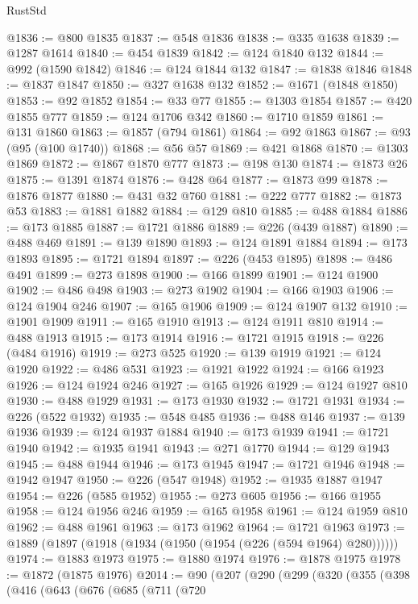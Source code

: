 \begin{lexlean}{RustStd}
\begin{coremodule}
@1836 := @800 @1835
@1837 := @548 @1836
@1838 := @335 @1638
@1839 := @1287 @1614
@1840 := @454 @1839
@1842 := @124 @1840 @132
@1844 := @992 (@1590 @1842)
@1846 := @124 @1844 @132
@1847 := @1838 @1846
@1848 := @1837 @1847
@1850 := @327 @1638 @132
@1852 := @1671 (@1848 @1850)
@1853 := @92 @1852
@1854 := @33 @77
@1855 := @1303 @1854
@1857 := @420 @1855 @777
@1859 := @124 @1706 @342
@1860 := @1710 @1859
@1861 := @131 @1860
@1863 := @1857 (@794 @1861)
@1864 := @92 @1863
@1867 := @93 (@95 (@100 @1740))
@1868 := @56 @57
@1869 := @421 @1868
@1870 := @1303 @1869
@1872 := @1867 @1870 @777
@1873 := @198 @130
@1874 := @1873 @26
@1875 := @1391 @1874
@1876 := @428 @64
@1877 := @1873 @99
@1878 := @1876 @1877
@1880 := @431 @32 @760
@1881 := @222 @777
@1882 := @1873 @53
@1883 := @1881 @1882
@1884 := @129 @810
@1885 := @488 @1884
@1886 := @173 @1885
@1887 := @1721 @1886
@1889 := @226 (@439 @1887)
@1890 := @488 @469
@1891 := @139 @1890
@1893 := @124 @1891 @1884
@1894 := @173 @1893
@1895 := @1721 @1894
@1897 := @226 (@453 @1895)
@1898 := @486 @491
@1899 := @273 @1898
@1900 := @166 @1899
@1901 := @124 @1900
@1902 := @486 @498
@1903 := @273 @1902
@1904 := @166 @1903
@1906 := @124 @1904 @246
@1907 := @165 @1906
@1909 := @124 @1907 @132
@1910 := @1901 @1909
@1911 := @165 @1910
@1913 := @124 @1911 @810
@1914 := @488 @1913
@1915 := @173 @1914
@1916 := @1721 @1915
@1918 := @226 (@484 @1916)
@1919 := @273 @525
@1920 := @139 @1919
@1921 := @124 @1920
@1922 := @486 @531
@1923 := @1921 @1922
@1924 := @166 @1923
@1926 := @124 @1924 @246
@1927 := @165 @1926
@1929 := @124 @1927 @810
@1930 := @488 @1929
@1931 := @173 @1930
@1932 := @1721 @1931
@1934 := @226 (@522 @1932)
@1935 := @548 @485
@1936 := @488 @146
@1937 := @139 @1936
@1939 := @124 @1937 @1884
@1940 := @173 @1939
@1941 := @1721 @1940
@1942 := @1935 @1941
@1943 := @271 @1770
@1944 := @129 @1943
@1945 := @488 @1944
@1946 := @173 @1945
@1947 := @1721 @1946
@1948 := @1942 @1947
@1950 := @226 (@547 @1948)
@1952 := @1935 @1887 @1947
@1954 := @226 (@585 @1952)
@1955 := @273 @605
@1956 := @166 @1955
@1958 := @124 @1956 @246
@1959 := @165 @1958
@1961 := @124 @1959 @810
@1962 := @488 @1961
@1963 := @173 @1962
@1964 := @1721 @1963
@1973 := @1889 (@1897 (@1918 (@1934 (@1950 (@1954 (@226 (@594 @1964) @280))))))
@1974 := @1883 @1973
@1975 := @1880 @1974
@1976 := @1878 @1975
@1978 := @1872 (@1875 @1976)
@2014 := @90
    (@207
      (@290
        (@299
          (@320
            (@355
              (@398
                (@416
                  (@643
                    (@676
                      (@685
                        (@711
                          (@720

\end{coremodule}
\end{lexlean}

